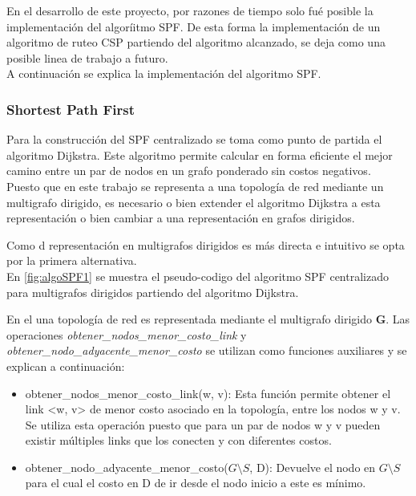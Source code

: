 En el desarrollo de este proyecto, por razones de tiempo solo fu\'e posible la implementaci\'on del algor\'iitmo SPF. De esta forma la implementaci\'on de un algoritmo de ruteo CSP partiendo del algoritmo alcanzado, se deja como una posible linea de trabajo a futuro.\\

A continuaci\'on se explica la implementaci\'on del algoritmo SPF. 

\subsubsection{Shortest Path First}
Para la construcci\'on del SPF centralizado se toma como punto de partida el algoritmo Dijkstra. Este algoritmo permite calcular en forma eficiente el mejor camino entre un par de nodos en un grafo ponderado sin costos negativos.\\

Puesto que en este trabajo se representa a una topolog\'ia de red mediante un multigrafo dirigido, es necesario o bien extender el algoritmo Dijkstra a esta representaci\'on o bien cambiar a una representación en grafos dirigidos. 

Como d representaci\'on en multigrafos dirigidos es m\'as directa e intuitivo se opta por la primera alternativa.\\

En \ref{fig:algoSPF1} se muestra el pseudo-codigo del algoritmo SPF centralizado para multigrafos dirigidos partiendo del algoritmo Dijkstra.

En el una topolog\'ia de red es representada mediante el multigrafo dirigido \textbf{G}. Las operaciones \textit{obtener\_nodos\_menor\_costo\_link} y \textit{obtener\_nodo\_adyacente\_menor\_costo} se utilizan como funciones auxiliares y se explican a continuaci\'on:

\begin{itemize}
\item obtener\_nodos\_menor\_costo\_link(w, v): Esta funci\'on permite obtener el link <w, v> de menor costo asociado en la topolog\'ia, entre los nodos w y v. Se utiliza esta operaci\'on puesto que para un par de nodos w y v pueden existir m\'ultiples links que los conecten y con diferentes costos. 

\item obtener\_nodo\_adyacente\_menor\_costo($G\setminus S$, D): Devuelve el nodo en $G\setminus S$ para el cual el costo en D de ir desde el nodo inicio a este es m\'inimo.
\end{itemize}

